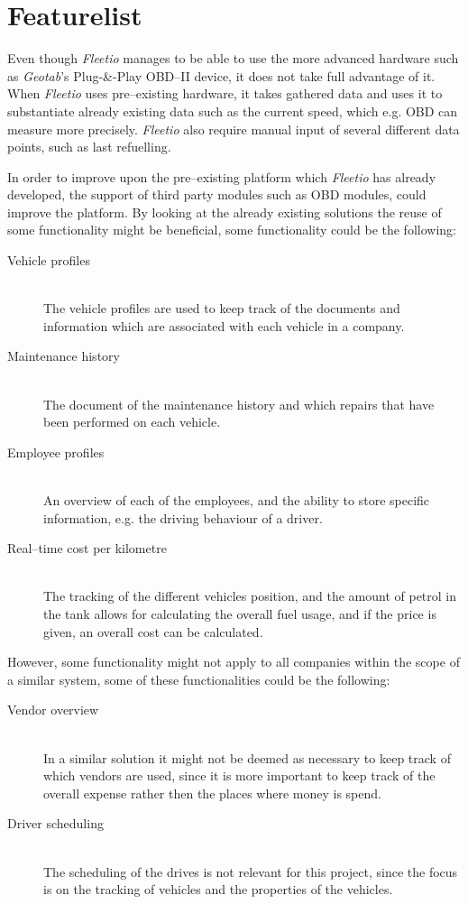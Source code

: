 \section{Featurelist}
Even though \textit{Fleetio} manages to be able to use the more advanced hardware such as \textit{Geotab}'s Plug-\&-Play OBD--II device, it does not take full advantage of it.
When \textit{Fleetio} uses pre--existing hardware, it takes gathered data and uses it to substantiate already existing data such as the current speed, which e.g. \ac{OBD} can measure more precisely.
\textit{Fleetio} also require manual input of several different data points, such as last refuelling.

In order to improve upon the pre--existing platform which \textit{Fleetio} has already developed, the support of third party modules such as \ac{OBD} modules, could improve the platform.
By looking at the already existing solutions the reuse of some functionality might be beneficial, some functionality could be the following:
\begin{description}
    \item[Vehicle profiles] \hfill \\
    The vehicle profiles are used to keep track of the documents and information which are associated with each vehicle in a company.
    \item[Maintenance history] \hfill \\
    The document of the maintenance history and which repairs that have been performed on each vehicle.
    \item[Employee profiles] \hfill \\
    An overview of each of the employees, and the ability to store specific information, e.g. the driving behaviour of a driver.
    \item[Real--time cost per kilometre] \hfill \\
    The tracking of the different vehicles position, and the amount of petrol in the tank allows for calculating the overall fuel usage, and if the price is given, an overall cost can be calculated.
\end{description}

However, some functionality might not apply to all companies within the scope of a similar system, some of these functionalities could be the following:
\begin{description}
    \item[Vendor overview] \hfill \\
    In a similar solution it might not be deemed as necessary to keep track of which vendors are used, since it is more important to keep track of the overall expense rather then the places where money is spend.
    \item[Driver scheduling] \hfill \\
    The scheduling of the drives is not relevant for this project, since the focus is on the tracking of vehicles and the properties of the vehicles.
\end{description}

